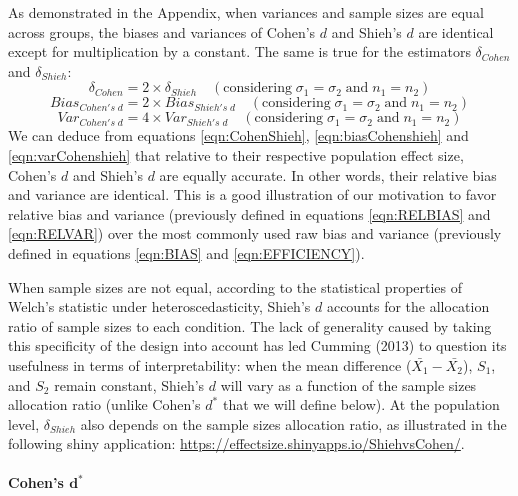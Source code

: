 \documentclass[
  12pt,
  french,
]{article}
\begin{document}
As demonstrated in the Appendix, when variances and sample sizes are
equal across groups, the biases and variances of Cohen's \(d\) and
Shieh's \(d\) are identical except for multiplication by a constant. The
same is true for the estimators \(\delta_{Cohen}\) and
\(\delta_{Shieh}\):\\
\begin{equation} 
\delta_{Cohen} = 2 \times \delta_{Shieh} \quad (\mbox{considering} \; \sigma_1 = \sigma_2 \; \mbox{and} \; n_1 = n_2)
\label{eqn:CohenShieh}
\end{equation} \begin{equation} 
Bias_{Cohen's \; d} = 2 \times Bias_{Shieh's \; d} \quad (\mbox{considering} \; \sigma_1 = \sigma_2 \; \mbox{and} \; n_1 = n_2)
\label{eqn:biasCohenshieh}
\end{equation} \begin{equation} 
Var_{Cohen's \; d} = 4 \times Var_{Shieh's \; d} \quad (\mbox{considering}\; \sigma_1 = \sigma_2 \; \mbox{and} \; n_1 = n_2)
\label{eqn:varCohenshieh}
\end{equation} We can deduce from equations \ref{eqn:CohenShieh},
\ref{eqn:biasCohenshieh} and \ref{eqn:varCohenshieh} that relative to
their respective population effect size, Cohen's \(d\) and Shieh's \(d\)
are equally accurate. In other words, their relative bias and variance
are identical. This is a good illustration of our motivation to favor
relative bias and variance (previously defined in equations
\ref{eqn:RELBIAS} and \ref{eqn:RELVAR}) over the most commonly used raw
bias and variance (previously defined in equations \ref{eqn:BIAS} and
\ref{eqn:EFFICIENCY}).

When sample sizes are not equal, according to the statistical properties
of Welch's statistic under heteroscedasticity, Shieh's \(d\) accounts
for the allocation ratio of sample sizes to each condition. The lack of
generality caused by taking this specificity of the design into account
has led Cumming (2013) to question its usefulness in terms of
interpretability: when the mean difference (\(\bar{X_1}-\bar{X_2}\)),
\(S_1\), and \(S_2\) remain constant, Shieh's \(d\) will vary as a
function of the sample sizes allocation ratio (unlike Cohen's \(d^*\)
that we will define below). At the population level, \(\delta_{Shieh}\)
also depends on the sample sizes allocation ratio, as illustrated in the
following shiny application:
\url{https://effectsize.shinyapps.io/ShiehvsCohen/}.

\hypertarget{cohens-bmd}{%
\paragraph{\texorpdfstring{Cohen's
\(\bm{d^*}\)}{Cohen's \textbackslash bm\{d\^{}*\}}}\label{cohens-bmd}}
\end{document}

